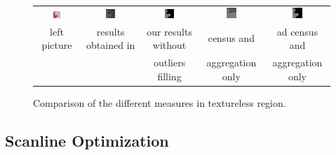 \documentclass{ipol}
\begin{document}
\begin{figure}[h]
\begin{center}	
\begin{tabular}{ccccc}
\includegraphics[width=0.18\textwidth]{Images/pictures/teddy_crop.png} &
\includegraphics[width=0.18\textwidth]{Images/theorical_results/teddy_crop.png} &
\includegraphics[width=0.18\textwidth]{Images/practical_results/teddy_crop.png} &
\includegraphics[width=0.18\textwidth]{Images/practical_results/teddy_census_crop.png} &
\includegraphics[width=0.18\textwidth]{Images/practical_results/teddy_ad_census_crop.png} \\
left picture & results obtained in \cite{adCensus} & our results without & census and & ad census and\\
& & outliers filling & aggregation only & aggregation only\\
\end{tabular}
	\caption{Comparison of the different measures in textureless region.}
	\label{censusPics}
\end{center}
\end{figure}

\subsection{Scanline Optimization}
\end{document}
